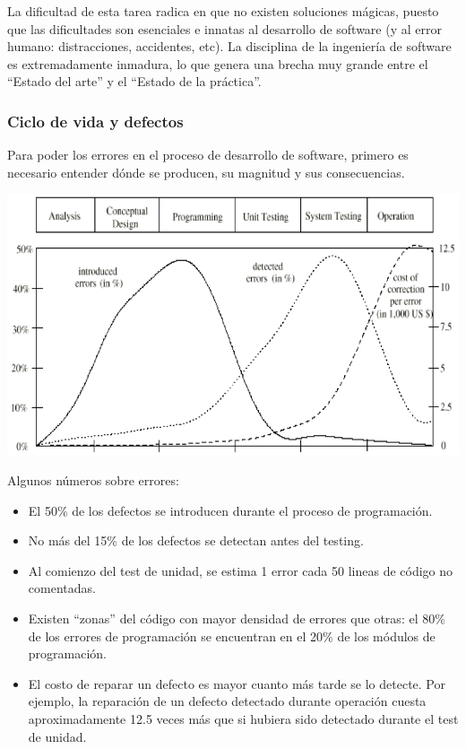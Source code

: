 \documentclass[]{article}
\begin{document}
La dificultad de esta tarea radica en que no existen soluciones mágicas, puesto que las dificultades son esenciales e innatas al desarrollo de software (y al error humano: distracciones, accidentes, etc). La disciplina de la ingeniería de software es extremadamente inmadura, lo que genera una brecha muy grande entre el ``Estado del arte'' y el ``Estado de la práctica''.

\subsubsection{Ciclo de vida y defectos}
Para poder los errores en el proceso de desarrollo de software, primero es necesario entender dónde se producen, su magnitud y sus consecuencias.
\begin{center}
	\includegraphics[scale=0.5]{VidaYDefectos.png}
\end{center}

Algunos números sobre errores:
\begin{itemize}
	\item El 50\% de los defectos se introducen durante el proceso de programación.
	\item No más del 15\% de los defectos se detectan antes del testing.
	\item Al comienzo del test de unidad, se estima 1 error cada 50 lineas de código no comentadas.
	\item Existen ``zonas'' del código con mayor densidad de errores que otras: el 80\% de los errores de programación se encuentran en el 20\% de los módulos de programación.
	\item El costo de reparar un defecto es mayor cuanto más tarde se lo detecte. Por ejemplo, la reparación de un defecto detectado durante operación cuesta aproximadamente 12.5 veces más que si hubiera sido detectado durante el test de unidad.
\end{itemize}
\end{document}
